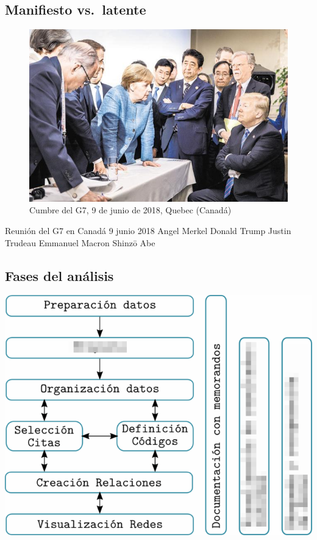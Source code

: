 \hypertarget{manifiesto-latente}{%
\subsection{Manifiesto vs.~latente}\label{manifiesto-latente}}

\begin{figure}
\centering
\includegraphics{imagenes-cuali/merkel-trump-merkel.jpg}
\caption{Cumbre del G7, 9 de junio de 2018, Quebec (Canadá)}
\end{figure}

Reunión del G7 en Canadá 9 junio 2018 Angel Merkel Donald Trump Justin
Trudeau Emmanuel Macron Shinzō Abe

\hypertarget{fases-analisis}{%
\subsection{Fases del análisis}\label{fases-analisis}}

\includegraphics{imagenes-cuali/Fases.png}

